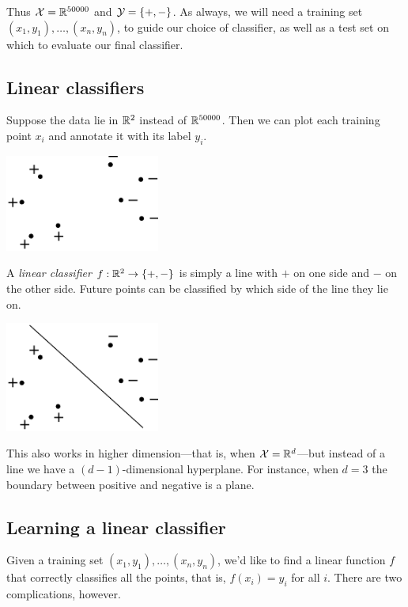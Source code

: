 Thus ${\cal X} = \mathbb{R}^{50000}$ and ${\cal Y} = \{+,-\}$. As always, we will need a training set
$(x_1, y_1), \ldots, (x_n, y_n)$, to guide our choice of classifier, as well as a 
test set on which to evaluate our final classifier.

\subsection{Linear classifiers}

Suppose the data lie in $\mathbb{R}^2$ instead of $\mathbb{R}^{50000}$. Then we can plot each training
point $x_i$ and annotate it with its label $y_i$.

\begin{center}
\includegraphics[width=2in]{figs/linear1.pdf}
\end{center}

A {\it linear classifier} $f: \mathbb{R}^2 \rightarrow \{+,-\}$ is simply a line with $+$ on one
side and $-$ on the other side. Future points can be classified by which side of the line
they lie on.

\begin{center}
\includegraphics[width=2in]{figs/linear2.pdf}
\end{center}

\noindent
This also works in higher dimension---that is, when ${\cal X} = \mathbb{R}^d$---but instead of a line
we have a $(d-1)$-dimensional hyperplane. For instance, when $d=3$ the boundary between
positive and negative is a plane.

\subsection{Learning a linear classifier}

Given a training set $(x_1, y_1), \ldots, (x_n, y_n)$, we'd like to find a linear
function $f$ that correctly classifies all the points, that is, $f(x_i) = y_i$ 
for all $i$. There are two complications, however.

